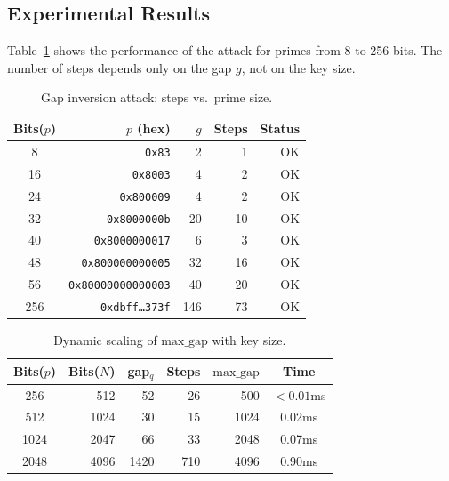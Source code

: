 \documentclass[12pt,a4paper]{article}
\theoremstyle{plain}
\begin{document}
\subsection{Experimental Results}

Table~\ref{tab:gap_inversion} shows the performance of the attack
for primes from 8 to 256 bits. The number of steps depends only
on the gap $g$, not on the key size.

\begin{table}[htbp]
\centering
\caption{Gap inversion attack: steps vs.\ prime size.}
\label{tab:gap_inversion}
\begin{tabular}{crrrr}
\hline
Bits($p$) & $p$ (hex) & $g$ & Steps & Status \\
\hline
8  & \texttt{0x83} & 2  & 1   & OK \\
16 & \texttt{0x8003} & 4  & 2   & OK \\
24 & \texttt{0x800009} & 4  & 2   & OK \\
32 & \texttt{0x8000000b} & 20 & 10  & OK \\
40 & \texttt{0x8000000017} & 6  & 3   & OK \\
48 & \texttt{0x800000000005} & 32 & 16  & OK \\
56 & \texttt{0x80000000000003} & 40 & 20  & OK \\
256 & \texttt{0xdbff\ldots 373f} & 146 & 73 & OK \\
\hline
\end{tabular}
\end{table}

\begin{table}[htbp]
\centering
\caption{Dynamic scaling of $\text{max\_gap}$ with key size.}
\label{tab:gap_scaling}
\begin{tabular}{crrrrc}
\hline
Bits($p$) & Bits($N$) & gap$_q$ & Steps & $\text{max\_gap}$ & Time \\
\hline
256  & 512  & 52  & 26   & 500    & $<0.01$ms \\
512  & 1024 & 30  & 15   & 1024   & 0.02ms \\
1024 & 2047 & 66  & 33   & 2048   & 0.07ms \\
2048 & 4096 & 1420 & 710 & 4096   & 0.90ms \\
\hline
\end{tabular}
\end{table}
\end{document}
